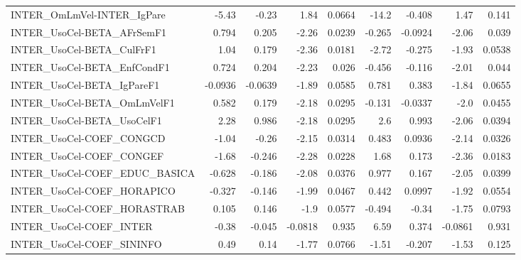 \begin{tabular}{lrrrrrrrr}
INTER\_OmLmVel-INTER\_IgPare            &       -5.43 &        -0.23 &    1.84 &   0.0664 &      -14.2 &      -0.408 &         1.47 &         0.141 \\
INTER\_UsoCel-BETA\_AFrSemF1            &       0.794 &        0.205 &   -2.26 &   0.0239 &     -0.265 &     -0.0924 &        -2.06 &         0.039 \\
INTER\_UsoCel-BETA\_CulFrF1             &        1.04 &        0.179 &   -2.36 &   0.0181 &      -2.72 &      -0.275 &        -1.93 &        0.0538 \\
INTER\_UsoCel-BETA\_EnfCondF1           &       0.724 &        0.204 &   -2.23 &    0.026 &     -0.456 &      -0.116 &        -2.01 &         0.044 \\
INTER\_UsoCel-BETA\_IgPareF1            &     -0.0936 &      -0.0639 &   -1.89 &   0.0585 &      0.781 &       0.383 &        -1.84 &        0.0655 \\
INTER\_UsoCel-BETA\_OmLmVelF1           &       0.582 &        0.179 &   -2.18 &   0.0295 &     -0.131 &     -0.0337 &         -2.0 &        0.0455 \\
INTER\_UsoCel-BETA\_UsoCelF1            &        2.28 &        0.986 &   -2.18 &   0.0295 &        2.6 &       0.993 &        -2.06 &        0.0394 \\
INTER\_UsoCel-COEF\_CONGCD              &       -1.04 &        -0.26 &   -2.15 &   0.0314 &      0.483 &      0.0936 &        -2.14 &        0.0326 \\
INTER\_UsoCel-COEF\_CONGEF              &       -1.68 &       -0.246 &   -2.28 &   0.0228 &       1.68 &       0.173 &        -2.36 &        0.0183 \\
INTER\_UsoCel-COEF\_EDUC\_BASICA         &      -0.628 &       -0.186 &   -2.08 &   0.0376 &      0.977 &       0.167 &        -2.05 &        0.0399 \\
INTER\_UsoCel-COEF\_HORAPICO            &      -0.327 &       -0.146 &   -1.99 &   0.0467 &      0.442 &      0.0997 &        -1.92 &        0.0554 \\
INTER\_UsoCel-COEF\_HORASTRAB           &       0.105 &        0.146 &    -1.9 &   0.0577 &     -0.494 &       -0.34 &        -1.75 &        0.0793 \\
INTER\_UsoCel-COEF\_INTER               &       -0.38 &       -0.045 & -0.0818 &    0.935 &       6.59 &       0.374 &      -0.0861 &         0.931 \\
INTER\_UsoCel-COEF\_SININFO             &        0.49 &         0.14 &   -1.77 &   0.0766 &      -1.51 &      -0.207 &        -1.53 &         0.125 \\

\end{tabular}
